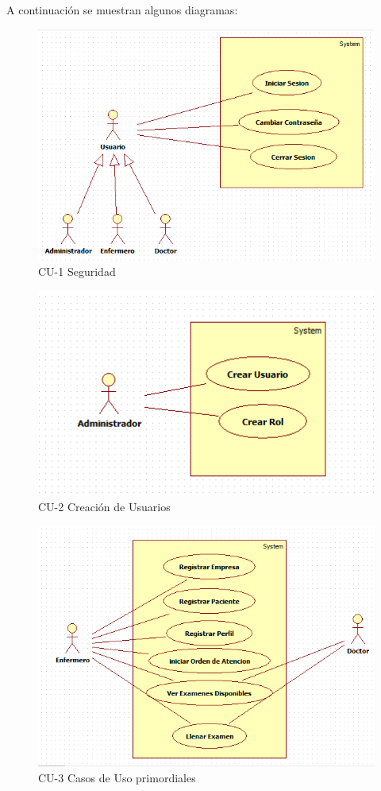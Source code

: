 		A continuación se muestran algunos diagramas:
		
		\begin{figure}[ht!]
		    \centering
			\includegraphics{../imgs/casos-uso/1.png}
			\caption{CU-1 Seguridad}
		\end{figure}
		
	\newpage
		
		\begin{figure}[ht!]
		    \centering
			\includegraphics{../imgs/casos-uso/2.png}
			\caption{CU-2 Creación de Usuarios}
		\end{figure}
		
		\begin{figure}[ht!]
		    \centering
			\includegraphics{../imgs/casos-uso/3.png}
			\caption{CU-3 Casos de Uso primordiales}
		\end{figure}
		

